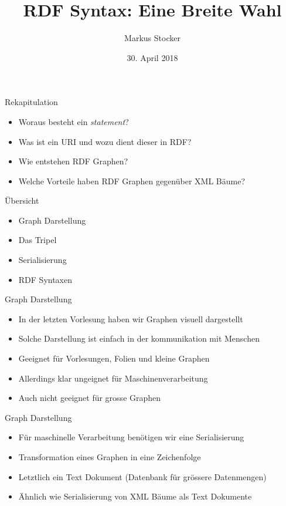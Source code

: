 \documentclass{beamer}
\title{RDF Syntax: Eine Breite Wahl}
\author{Markus Stocker}
\date{30. April 2018}
\begin{document}
\maketitle

\begin{frame}{Rekapitulation}
	
	\begin{itemize}
		\item Woraus besteht ein \emph{statement}?
		\item Was ist ein URI und wozu dient dieser in RDF?
		\item Wie entstehen RDF Graphen?
		\item Welche Vorteile haben RDF Graphen gegenüber XML Bäume?
	\end{itemize}
	
\end{frame}

\begin{frame}{Übersicht}
	
	\begin{itemize}
		\item Graph Darstellung
		\item Das Tripel
		\item Serialisierung
		\item RDF Syntaxen
	\end{itemize}
	
\end{frame}

\begin{frame}{Graph Darstellung}
	
	\begin{itemize}
		\item In der letzten Vorlesung haben wir Graphen visuell dargestellt
		\item Solche Darstellung ist einfach in der kommunikation mit Menschen
		\item Geeignet für Vorlesungen, Folien und kleine Graphen
		\item Allerdings klar ungeignet für Maschinenverarbeitung
		\item Auch nicht geeignet für grosse Graphen
	\end{itemize}
	
\end{frame}

\begin{frame}{Graph Darstellung}
	
	\begin{itemize}
		\item Für maschinelle Verarbeitung benötigen wir eine Serialisierung
		\item Transformation eines Graphen in eine Zeichenfolge
		\item Letztlich ein Text Dokument (Datenbank für grössere Datenmengen)
		\item Ähnlich wie Serialisierung von XML Bäume als Text Dokumente
	\end{itemize}
	
\end{frame}
\end{document}

